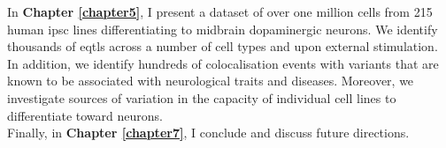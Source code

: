 In \textbf{Chapter 
\ref{chapter5}}, I present a dataset of over one million cells from 215 human \gls{ipsc} lines differentiating to midbrain dopaminergic neurons.
We identify thousands of \glspl{eqtl} across a number of cell types and upon external stimulation.
In addition, we identify hundreds of colocalisation events with variants that are known to be associated with neurological traits and diseases.
Moreover, we investigate sources of variation in the capacity of individual cell lines to differentiate toward neurons.\\


Finally, in \textbf{Chapter 
\ref{chapter7}}, I conclude and discuss future directions.
